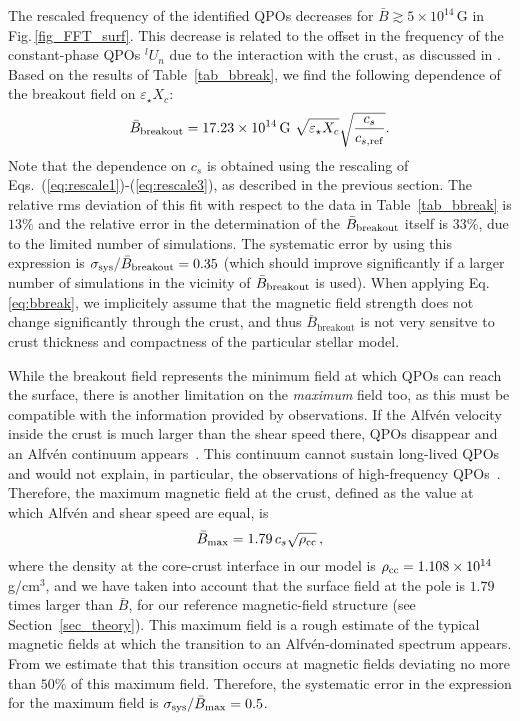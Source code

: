 \documentclass[useAMS,usenatbib]{mnras}
\begin{document}
The rescaled frequency of the identified QPOs decreases for 
$\bar B \gtrsim 5\times10^{14}\,$G in Fig.\,\ref{fig_FFT_surf}. This decrease 
is related to the offset in the frequency of the constant-phase QPOs ${}^l U_n$ 
due to the interaction with the crust, as discussed in \cite{Gabler2016}. Based 
on the results of Table~\ref{tab_bbreak}, we find the following dependence 
of the breakout field on 
$\varepsilon_\star X_c$:
%
\begin{equation}
\bar B_\mathrm{breakout} = 17.23 \times 10^{14}\,\mathrm{G}~ 
\sqrt{\varepsilon_\star X_c} \sqrt{\frac{c_s}{c_{s,{\rm ref}}}} . 
\label{eq:bbreak}
\end{equation}
%
Note that the dependence on $c_s$ is obtained using the rescaling of 
Eqs.~(\ref{eq:rescale1})-(\ref{eq:rescale3}), as described in the previous 
section. 
The relative rms deviation of this fit with respect to the data in 
Table~\ref{tab_bbreak} is $13\%$ and the relative error in the determination of 
the $\bar B_{\rm breakout}$ itself is $33\%$, due to the limited number of 
simulations. The systematic error by using this 
expression is $\sigma_{\rm sys} / \bar B_\mathrm{breakout}  = 0.35$ (which 
should improve significantly if a larger number of simulations in the vicinity 
of $\bar B_{\rm breakout}$ is used). 
When applying Eq.\,\ref{eq:bbreak}, we implicitely assume that the 
magnetic field strength does not change significantly through the crust, and 
thus $\bar B_\mathrm{breakout}$ is not very sensitve to crust thickness and 
compactness of the particular stellar model.

While the breakout field represents the minimum field at which QPOs can reach 
the surface, there is another limitation on the {\it maximum} field too, as 
this must be compatible with the information provided by observations. If the 
Alfv\'en velocity inside the crust is much larger than the shear speed there, 
QPOs disappear and an Alfv\'en continuum appears~\citep{Gabler2013a, 
Passamonti2013}. This continuum cannot sustain long-lived QPOs and would not 
explain, in particular, the observations of high-frequency 
QPOs~\citep{Levin2006,Levin2007}. Therefore, the maximum magnetic field at the 
crust, defined as the value at which Alfv\'en and shear speed are equal, is
\begin{equation}
{\bar B}_\mathrm{max} =  1.79\, c_s \sqrt{\rho_{\rm cc}}\,, \label{eq:bmax}
\end{equation}
where the density at the core-crust interface in our model is $\rho_{\rm 
cc}=1.108\times10^{14}$\,g/cm$^3$, and we have taken into account that the 
surface field at the pole is $1.79$ times larger than $\bar B$, for our 
reference magnetic-field structure (see Section~\ref{sec_theory}). This maximum 
field is a rough estimate of the typical magnetic fields at which the transition 
to an Alfv\'en-dominated spectrum appears. From \cite{Gabler2013a} we estimate 
that this transition occurs at magnetic fields deviating no more than $50\%$ of 
this maximum field. Therefore, the systematic error in the expression for the 
maximum field is $\sigma_{\rm sys}/{\bar B}_\mathrm{max} =0.5$.
\end{document}
